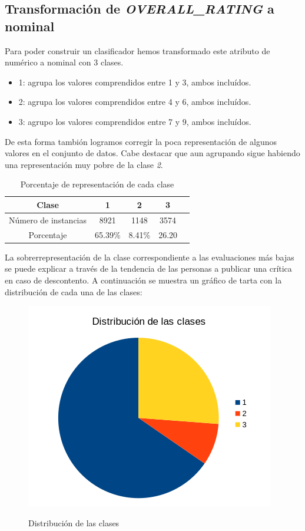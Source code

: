 \documentclass[es]{uc3mreport}
\begin{document}
\begin{report}
\subsection{Transformación de \textit{OVERALL\_RATING} a nominal}
\label{sec:overalltransform}
Para poder construir un clasificador hemos transformado este atributo de numérico a nominal con 3 clases.
\begin{itemize}
    \item 1: agrupa los valores comprendidos entre 1 y 3, ambos incluídos.
    \item 2: agrupa los valores comprendidos entre 4 y 6, ambos incluídos.
    \item 3: agrupo los valores comprendidos entre 7 y 9, ambos incluídos.
\end{itemize}

De esta forma tambión logramos corregir la poca representación de algunos valores en el conjunto de datos. Cabe destacar que aun agrupando sigue habiendo una representación muy pobre de la clase \textit{2}.

\begin{table}[H]
    \begin{center}
        \begin{tabular}{@{}ccccc@{}}
            \toprule
            Clase                & 1              & 2      & 3\\
            \midrule
            Número de instancias & 8921           & 1148   & 3574 \\
            Porcentaje           & 65.39\%        & 8.41\% & 26.20\\
            \bottomrule
        \end{tabular}
        \caption{Porcentaje de representación de cada clase}
    \end{center}
\end{table}

La sobrerrepresentación de la clase correspondiente a las evaluaciones más bajas se puede explicar a través de la tendencia de las personas a publicar una crítica en caso de descontento. A continuación se muestra un gráfico de tarta con la distribución de cada una de las clases:

\begin{figure}[H]
    \center
    \includegraphics[width=0.60\linewidth]{overall_clases.png}\\
    \caption{Distribución de las clases}
\end{figure}


\end{report}
\end{document}
